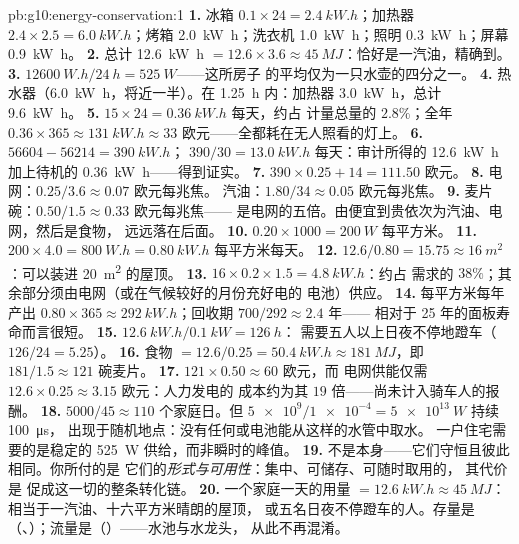 \begin{solution}{pb:g10:energy-conservation:1}
\textbf{1.} 冰箱 $0.1 \times 24 = \qty{2.4}{kW.h}$；加热器
$2.4 \times 2.5 = \qty{6.0}{kW.h}$；烤箱 \qty{2.0}{kW.h}；洗衣机
\qty{1.0}{kW.h}；照明 \qty{0.3}{kW.h}；屏幕
\qty{0.9}{kW.h}。
\textbf{2.} 总计 \qty{12.6}{kW.h} $= 12.6 \times 3.6 \approx
\qty{45}{MJ}$：恰好是一汽油，精确到。
\textbf{3.} $\qty{12600}{W.h}/\qty{24}{h} = \qty{525}{W}$——这所房子
的平均仅为一只水壶的四分之一。
\textbf{4.} 热水器（\qty{6.0}{kW.h}，将近一半）。在
\qty{1.25}{h} 内：加热器 \qty{3.0}{kW.h}，总计 \qty{9.6}{kW.h}。
\textbf{5.} $15 \times 24 = \qty{0.36}{kW.h}$ 每天，约占
计量总量的 $2.8\%$；全年 $0.36 \times 365 \approx
\qty{131}{kW.h} \approx 33$ 欧元——全都耗在无人照看的灯上。
\textbf{6.} $56604 - 56214 = \qty{390}{kW.h}$；
$390/30 = \qty{13.0}{kW.h}$ 每天：审计所得的 \qty{12.6}{kW.h}
加上待机的 \qty{0.36}{kW.h}——得到证实。
\textbf{7.} $390 \times 0.25 + 14 = 111.50$ 欧元。
\textbf{8.} 电网：$0.25/3.6 \approx 0.07$ 欧元每兆焦。
汽油：$1.80/34 \approx 0.05$ 欧元每兆焦。
\textbf{9.} 麦片碗：$0.50/1.5 \approx 0.33$ 欧元每兆焦——
是电网的五倍。由便宜到贵依次为汽油、电网，然后是食物，
远远落在后面。
\textbf{10.} $0.20 \times 1000 = \qty{200}{W}$ 每平方米。
\textbf{11.} $200 \times 4.0 = \qty{800}{W.h} = \qty{0.80}{kW.h}$
每平方米每天。
\textbf{12.} $12.6/0.80 = 15.75 \approx \qty{16}{m^2}$：可以装进
\qty{20}{m^2} 的屋顶。
\textbf{13.} $16 \times 0.2 \times 1.5 = \qty{4.8}{kW.h}$：约占
需求的 $38\%$；其余部分须由电网（或在气候较好的月份充好电的
电池）供应。
\textbf{14.} 每平方米每年产出 $0.80 \times 365 \approx
\qty{292}{kW.h}$；回收期 $700/292 \approx 2.4$ 年——
相对于 25 年的面板寿命而言很短。
\textbf{15.} $\qty{12.6}{kW.h}/\qty{0.1}{kW} = \qty{126}{h}$：
需要五人以上日夜不停地蹬车（$126/24 = 5.25$）。
\textbf{16.} 食物 $= 12.6/0.25 = \qty{50.4}{kW.h} \approx
\qty{181}{MJ}$，即 $181/1.5 \approx 121$ 碗麦片。
\textbf{17.} $121 \times 0.50 \approx 60$ 欧元，而
电网供能仅需 $12.6 \times 0.25 \approx 3.15$ 欧元：人力发电的
成本约为其 $19$ 倍——尚未计入骑车人的报酬。
\textbf{18.} $5000/45 \approx 110$ 个家庭日。但
$\num{5e9}/\num{1e-4} = \qty{5e13}{W}$ 持续 \qty{100}{\micro s}，
出现于随机地点：没有任何或电池能从这样的水管中取水。
一户住宅需要的是稳定的 \qty{525}{W} 供给，而非瞬时的峰值。
\textbf{19.} 不是本身——它们守恒且彼此相同。你所付的是
它们的\emph{形式与可用性}：集中、可储存、可随时取用的，
其代价是
促成这一切的整条转化链。
\textbf{20.} 一个家庭一天的用量 $= \qty{12.6}{kW.h} \approx
\qty{45}{MJ}$：相当于一汽油、十六平方米晴朗的屋顶，
或五名日夜不停蹬车的人。存量是
（、）；流量是（）——水池与水龙头，
从此不再混淆。
\end{solution}
